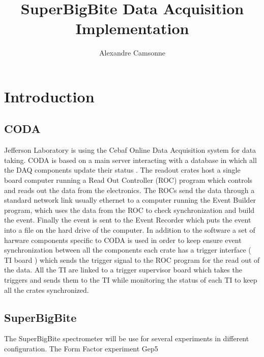 \documentclass{article}
\title {SuperBigBite Data Acquisition Implementation}
\author{Alexandre Camsonne}
\begin{document}
\section{Introduction}
\subsection{CODA}
Jefferson Laboratory is using the Cebaf Online Data Acquisition system for data taking.
CODA is based on a main server interacting with a database in which all the DAQ components update their status . The readout crates host a single board computer running a Read Out Controller (ROC) program which controls and reads out the data from the electronics. The ROCs send the data through a standard network link usually ethernet to a computer running the Event Builder program, which uses the data from the ROC to check synchronization and build the event. Finally the event is sent to the Event Recorder which puts the event into a file on the hard drive of the computer.
In addition to the software a set of harware components specific to CODA is used in order to keep ensure event synchronization between all the components each crate has a trigger interface ( TI board ) which sends the trigger signal to the ROC program for the read out of the data. All the TI are linked to a trigger supervisor board which takes the triggers and sends them to the TI while monitoring the status of each TI to keep all the crates synchronized.
\subsection{SuperBigBite}
The SuperBigBite spectrometer will be use for several experiments in different configuration.
The Form Factor experiment Gep5
\end{document}
